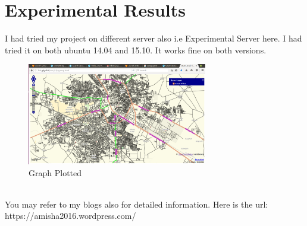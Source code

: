 
\section{Experimental Results}
I had tried my project on different server also i.e Experimental Server here. I had tried it on both ubuntu 14.04 and 15.10. It works fine on both versions.
\begin{figure}[!ht]
	\centering
	\includegraphics[width=0.7\textwidth]{input/images/exp.png}                
	\caption{Graph Plotted}
	\hspace{-1.5em}
\end{figure}\\
You may refer to my blogs also for detailed information.
Here is the url: 
https://amisha2016.wordpress.com/

 
 
 

